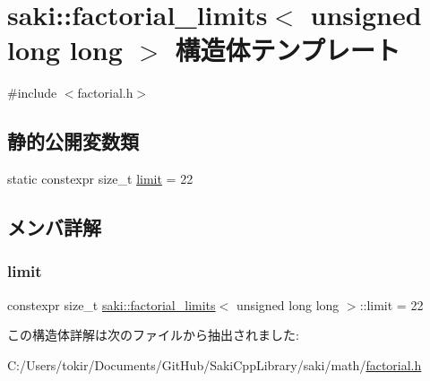 \hypertarget{structsaki_1_1factorial__limits_3_01unsigned_01long_01long_01_4}{}\section{saki\+:\+:factorial\+\_\+limits$<$ unsigned long long $>$ 構造体テンプレート}
\label{structsaki_1_1factorial__limits_3_01unsigned_01long_01long_01_4}


{\ttfamily \#include $<$factorial.\+h$>$}

\subsection*{静的公開変数類}
\begin{DoxyCompactItemize}
\item 
static constexpr size\+\_\+t \mbox{\hyperlink{structsaki_1_1factorial__limits_3_01unsigned_01long_01long_01_4_af26bf93906172aff653a886a9b9f13e1}{limit}} = 22
\end{DoxyCompactItemize}


\subsection{メンバ詳解}
\mbox{\label{structsaki_1_1factorial__limits_3_01unsigned_01long_01long_01_4_af26bf93906172aff653a886a9b9f13e1}} 
\subsubsection{\texorpdfstring{limit}{limit}}
{\footnotesize\ttfamily constexpr size\+\_\+t \mbox{\hyperlink{structsaki_1_1factorial__limits}{saki\+::factorial\+\_\+limits}}$<$ unsigned long long $>$\+::limit = 22\hspace{0.3cm}{\ttfamily [static]}}



この構造体詳解は次のファイルから抽出されました\+:\begin{DoxyCompactItemize}
\item 
C\+:/\+Users/tokir/\+Documents/\+Git\+Hub/\+Saki\+Cpp\+Library/saki/math/\mbox{\hyperlink{factorial_8h}{factorial.\+h}}\end{DoxyCompactItemize}
